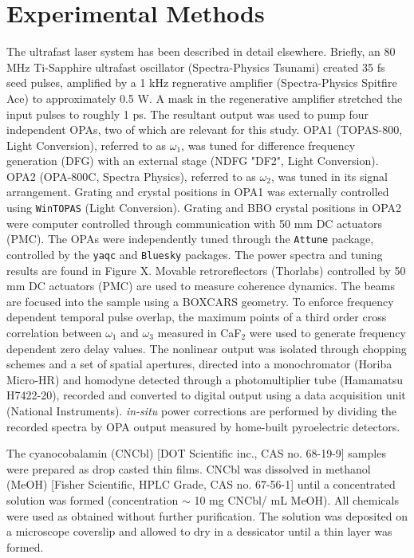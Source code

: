 \documentclass[aip, jcp, reprint, onecolumn]{revtex4-2}
\begin{document}
\section{Experimental Methods}
The ultrafast laser system has been described in detail elsewhere. \cite{RN278, Kaufman2024}
Briefly, an 80 MHz Ti-Sapphire ultrafast oscillator (Spectra-Physics Tsunami) created 35 fs seed pulses, amplified by a 1 kHz regnerative amplifier (Spectra-Physics Spitfire Ace) to approximately 0.5 W.
A mask in the regenerative amplifier stretched the input pulses to roughly 1 ps.
The resultant output was used to pump four independent OPAs, two of which are relevant for this study.
OPA1 (TOPAS-800, Light Conversion), referred to as $\omega_1$, was tuned for difference frequency generation (DFG) with an external stage (NDFG "DF2", Light Conversion).
OPA2 (OPA-800C, Spectra Physics), referred to as $\omega_2$, was tuned in its signal arrangement. 
Grating and crystal positions in OPA1 was externally controlled using \texttt{WinTOPAS} (Light Conversion).
Grating and BBO crystal positions in OPA2 were computer controlled through communication with 50 mm DC actuators (PMC). %
The OPAs were independently tuned through the \texttt{Attune} package, controlled by the \texttt{yaqc} and \texttt{Bluesky} packages. \cite{RN414, RN386, SkyeOPA, KyleOPA}
The power spectra and tuning results are found in Figure X.%
Movable retroreflectors (Thorlabs) controlled by 50 mm DC actuators (PMC) are used to measure coherence dynamics.
The beams are focused into the sample using a BOXCARS geometry.\cite{RN308, Kaufman2024}
To enforce frequency dependent temporal pulse overlap, the maximum points of a third order cross correlation between $\omega_1$ and $\omega_3$ measured in CaF$_2$ were used to generate frequency dependent zero delay values.
The nonlinear output was isolated through chopping schemes and a set of spatial apertures, directed into a monochromator (Horiba Micro-HR) and homodyne detected through a photomultiplier tube (Hamamatsu H7422-20), recorded and converted to digital output using a data acquisition unit (National Instruments).
\textit{in-situ} power corrections are performed by dividing the recorded spectra by OPA output measured by home-built pyroelectric detectors.

The cyanocobalamin (CNCbl) [DOT Scientific inc., CAS no. 68-19-9] samples were prepared as drop casted thin films.
CNCbl was dissolved in methanol (MeOH) [Fisher Scientific, HPLC Grade, CAS no. 67-56-1] until a concentrated solution was formed (concentration $\sim$ 10 mg CNCbl/ mL MeOH). 
All chemicals were used as obtained without further purification.
The solution was deposited on a microscope coverslip and allowed to dry in a dessicator until a thin layer was formed.
\end{document}
